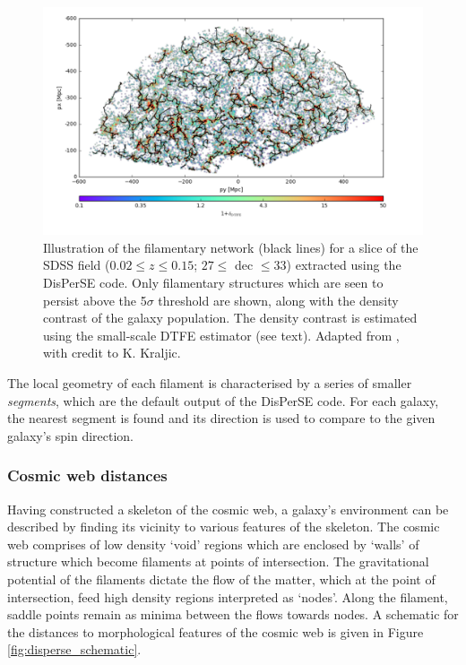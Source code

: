\begin{figure}
    \centering
	\includegraphics[width=\linewidth]{thesis/latex/halo_assembly_manga/SDSS_CW_DisPerSE.pdf}
    \caption[Illustration of the filamentary network for a slice of the SDSS field.]{Illustration of the filamentary network (black lines) for a slice of the SDSS field ($0.02 \leq z \leq 0.15$; $ 27 \leq$ dec $\leq 33$) extracted using the DisPerSE code. Only filamentary structures which are seen to persist above the 5$\sigma$ threshold are shown, along with the density contrast of the galaxy population. The density contrast is estimated using the small-scale DTFE estimator (see text). Adapted from \citet{duckworth2019}, with credit to K. Kraljic.}
    \label{fig:disperse_sdss}
\end{figure}

The local geometry of each filament is characterised by a series of smaller \textit{segments}, which are the default output of the DisPerSE code. For each galaxy, the nearest segment is found and its direction is used to compare to the given galaxy's spin direction. 

\subsubsection{Cosmic web distances} \label{sec:cosmic_web_distances}
Having constructed a skeleton of the cosmic web, a galaxy's environment can be described by finding its vicinity to various features of the skeleton. The cosmic web comprises of low density `void' regions which are enclosed by `walls' of structure which become filaments at points of intersection. The gravitational potential of the filaments dictate the flow of the matter, which at the point of intersection, feed high density regions interpreted as `nodes'. Along the filament, saddle points remain as minima between the flows towards nodes. A schematic for the distances to morphological features of the cosmic web is given in Figure \ref{fig:disperse_schematic}. 

